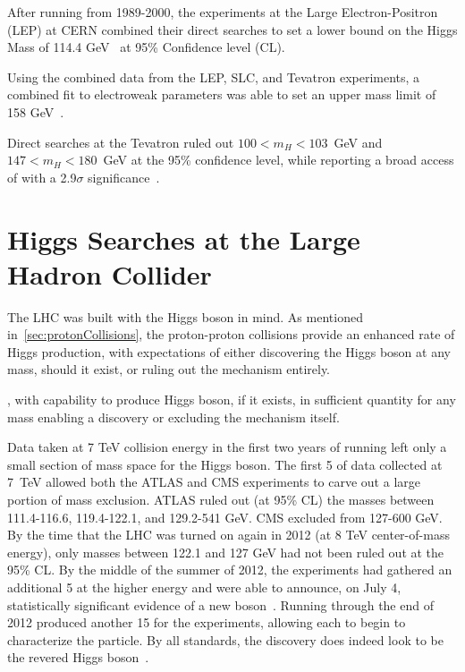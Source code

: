 After running from 1989-2000, the experiments at the Large Electron-Positron
(LEP) at CERN combined their direct searches to set a lower bound on the Higgs
Mass of 114.4 GeV~\cite{LEP:higgsLim} at 95\% Confidence level (CL).

Using the combined data from the LEP, SLC, and Tevatron experiments, a combined
fit to electroweak parameters was able to set an upper mass limit of 158
GeV~\cite{Grunewald:1313716}. %

Direct searches at the Tevatron ruled out $100 < m_H < 103$~GeV and
$147 < m_H < 180$~GeV at the 95\% confidence level, while reporting a broad
access of with a 2.9$\sigma$ significance~\cite{fnal:higgs}.

\section{Higgs Searches at the Large Hadron Collider}
The LHC was built with the Higgs boson in mind. As mentioned
in~\ref{sec:protonCollisions}, the proton-proton collisions provide an enhanced
rate of Higgs production, with expectations of either discovering the Higgs
boson at any mass, should it exist, or ruling out the mechanism entirely.

, with capability to produce Higgs boson, if it exists,
in sufficient quantity for any mass enabling a discovery or excluding the
mechanism itself.

Data taken at 7 TeV collision energy in the first two years of running left only
a small section of mass space for the Higgs boson. The first 5
\fbinv of data collected at 7~TeV allowed both the ATLAS and CMS experiments to carve out
a large portion of mass exclusion.  ATLAS ruled out (at 95\% CL) the masses
between 111.4-116.6, 119.4-122.1, and 129.2-541 GeV. CMS excluded from 127-600
GeV. By the time that the LHC was turned on again in 2012 (at 8 TeV
center-of-mass energy), only masses between 122.1 and 127 GeV had not been ruled
out at the 95\% CL. By the middle of the summer of 2012, the experiments had
gathered an additional 5 \fbinv at the higher energy and were able to announce,
on July 4, statistically significant evidence of a new
boson~\cite{cms:HiggsObs, atlas:HiggsObs}. Running through the end of 2012
produced another 15 \fbinv for the experiments, allowing each to begin to
characterize the particle. By all standards, the discovery does indeed look to
be the revered Higgs boson~\cite{ATLAS:higgsProperties, CMS:higgsProperties}.


